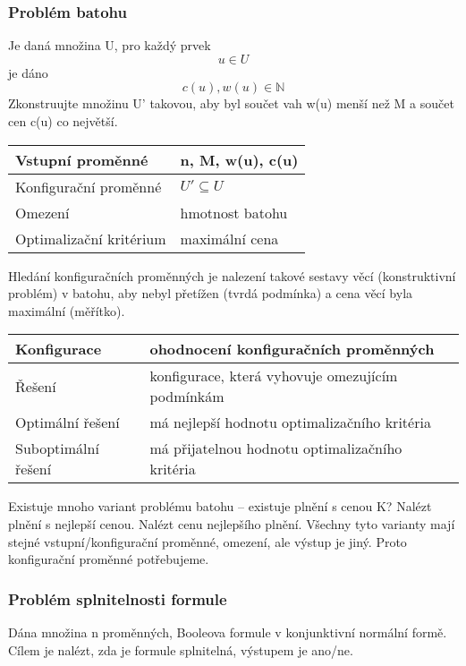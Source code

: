 \subsubsection*{Problém batohu}

Je daná množina U, pro každý prvek $$u \in U$$ je dáno $$c(u), w(u) \in \mathbb{N}$$ Zkonstruujte množinu U' takovou, aby byl součet vah w(u) menší než M a součet cen c(u) co největší.

\vspace{8pt}

\begin{tabular}{|l|l|}
    \hline
    Vstupní proměnné & n, M, w(u), c(u) \\
    \hline
    Konfigurační proměnné & $U' \subseteq U$ \\
    \hline
    Omezení & hmotnost batohu  \\
    \hline
    Optimalizační kritérium & maximální cena \\
    \hline
\end{tabular}

\vspace{8pt}

Hledání konfiguračních proměnných je nalezení takové sestavy věcí (konstruktivní problém) v batohu, aby nebyl přetížen (tvrdá podmínka) a cena věcí byla maximální (měřítko).

\vspace{8pt}

\begin{tabular}{|l|l|}
    \hline
    Konfigurace & ohodnocení konfiguračních proměnných \\
    \hline
    Řešení & konfigurace, která vyhovuje omezujícím podmínkám \\
    \hline
    Optimální řešení & má nejlepší hodnotu optimalizačního kritéria \\
    \hline
    Suboptimální řešení & má přijatelnou hodnotu optimalizačního kritéria \\
    \hline
\end{tabular}

\vspace{8pt}

Existuje mnoho variant problému batohu -- existuje plnění s cenou K? Nalézt plnění s nejlepší cenou. Nalézt cenu nejlepšího plnění. Všechny tyto varianty mají stejné vstupní/konfigurační proměnné, omezení, ale výstup je jiný. Proto konfigurační proměnné potřebujeme.

\subsubsection*{Problém splnitelnosti formule}

Dána množina n proměnných, Booleova formule v konjunktivní normální formě. Cílem je nalézt, zda je formule splnitelná, výstupem je ano/ne.
